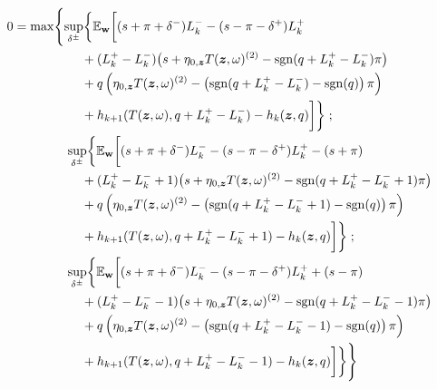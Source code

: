 \begin{equation}
\label{eq:discreteDPE}
\begin{split}
0 & = \max \Biggl\lbrace 
\sup_{\delta^\pm} \biggl\lbrace \E_{\bw} \biggl[
(s + \pi + \delta^-)L_k^- - (s - \pi - \delta^+)L_k^+ \\
& \hphantom{\sup_{\bu} \biggl\lbrace \E_{\bw} \biggl[ {}+{}} + (L_k^+ - L_k^-) \bigl( s + \eta_{0,\bz} T(\bz, \omega)^{(2)}  -\sgn( q + L_k^+ - L_k^-)\pi   \bigr) \\
& \hphantom{\sup_{\bu} \biggl\lbrace \E_{\bw} \biggl[ {}+{}} + q\left( \eta_{0,\bz} T(\bz, \omega)^{(2)}  -\left( \sgn( q + L_k^+ - L_k^-) - \sgn(q) \right) \pi \right) \\
& \hphantom{\sup_{\bu} \biggl\lbrace \E_{\bw} \biggl[ {}+{}} + h_{k+1}(T(\bz,\omega), q + L_k^+ - L_k^- ) -  h_k(\bz,q) \biggr] \biggr\rbrace \; ;\\
& \hphantom{{}={} \max \biggl\lbrace } \sup_{\delta^\pm} \biggl\lbrace \E_{\bw} \biggl[
(s + \pi + \delta^-)L_k^- - (s - \pi - \delta^+)L_k^+ - (s + \pi)\\
& \hphantom{\sup_{\bu} \biggl\lbrace \E_{\bw} \biggl[ {}+{}} + (L_k^+ - L_k^- +1) \bigl( s + \eta_{0,\bz} T(\bz, \omega)^{(2)}  -\sgn( q + L_k^+ - L_k^- +1)\pi   \bigr) \\
& \hphantom{\sup_{\bu} \biggl\lbrace \E_{\bw} \biggl[ {}+{}} + q\left( \eta_{0,\bz} T(\bz, \omega)^{(2)}  -\left( \sgn( q + L_k^+ - L_k^- +1) - \sgn(q) \right) \pi \right) \\
& \hphantom{\sup_{\bu} \biggl\lbrace \E_{\bw} \biggl[ {}+{}} + h_{k+1}(T(\bz,\omega), q + L_k^+ - L_k^- + 1) -  h_k(\bz,q) \biggr] \biggr\rbrace \; ; \\
& \hphantom{{}={} \max \biggl\lbrace } \sup_{\delta^\pm} \biggl\lbrace \E_{\bw} \biggl[
(s + \pi + \delta^-)L_k^- - (s - \pi - \delta^+)L_k^+ + (s - \pi) \\
& \hphantom{\sup_{\bu} \biggl\lbrace \E_{\bw} \biggl[ {}+{}} + (L_k^+ - L_k^- -1) \bigl( s + \eta_{0,\bz} T(\bz, \omega)^{(2)}  -\sgn( q + L_k^+ - L_k^- -1)\pi   \bigr) \\
& \hphantom{\sup_{\bu} \biggl\lbrace \E_{\bw} \biggl[ {}+{}} + q\left( \eta_{0,\bz} T(\bz, \omega)^{(2)}  -\left( \sgn( q + L_k^+ - L_k^- -1) - \sgn(q) \right) \pi \right) \\
& \hphantom{\sup_{\bu} \biggl\lbrace \E_{\bw} \biggl[ {}+{}} + h_{k+1}(T(\bz,\omega), q + L_k^+ - L_k^- -1) -  h_k(\bz,q) \biggr] \biggr\rbrace  \Biggr\rbrace
\end{split}
\end{equation}

